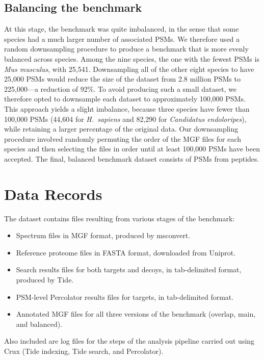 \documentclass{article}
\newcommand{\fixme}[1]{{\color{red}{\bf FIXME: #1}\color{black}}}
\begin{document}
\subsection*{Balancing the benchmark}

At this stage, the benchmark was quite imbalanced, in the sense that some species had a much larger number of associated PSMs.
We therefore used a random downsampling procedure to produce a benchmark that is more evenly balanced across species.
Among the nine species, the one with the fewest PSMs is \textit{Mus musculus}, with 25,541.
Downsampling all of the other eight species to have 25,000 PSMs would reduce the size of the dataset from 2.8 million PSMs to 225,000---a reduction of 92\%.
To avoid producing such a small dataset, we therefore opted to downsample each dataset to approximately 100,000 PSMs.
This approach yields a slight imbalance, because three species have fewer than 100,000 PSMs (44,604 for \textit{H.\ sapiens} and 82,290 for \textit{Candidatus endoloripes}), while retaining a larger percentage of the original data.
Our downsampling procedure involved randomly permuting the order of the MGF files for each species and then selecting the files in order until at least 100,000 PSMs have been accepted.
The final, balanced benchmark dataset consists of \fixme{XXX} PSMs from \fixme{XXX} peptides.

\section*{Data Records}

The dataset contains files resulting from various stages of the benchmark:
\begin{itemize}
\item Spectrum files in MGF format, produced by msconvert.
\item Reference proteome files in FASTA format, downloaded from Uniprot.
\item Search results files for both targets and decoys, in tab-delimited format, produced by Tide.
\item PSM-level Percolator results files for targets, in tab-delimited format.
\item Annotated MGF files for all three versions of the benchmark (overlap, main, and balanced).
\end{itemize}
Also included are log files for the steps of the analysis pipeline carried out using Crux \cite{park2008rapid} (Tide indexing, Tide search, and Percolator).
\end{document}
